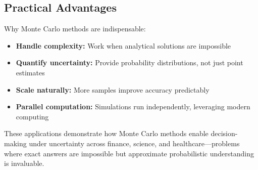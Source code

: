 \subsection{Practical Advantages}

Why Monte Carlo methods are indispensable:
\begin{itemize}
    \item \textbf{Handle complexity:} Work when analytical solutions are impossible
    \item \textbf{Quantify uncertainty:} Provide probability distributions, not just point estimates
    \item \textbf{Scale naturally:} More samples improve accuracy predictably
    \item \textbf{Parallel computation:} Simulations run independently, leveraging modern computing
\end{itemize}

These applications demonstrate how Monte Carlo methods enable decision-making under uncertainty across finance, science, and healthcare—problems where exact answers are impossible but approximate probabilistic understanding is invaluable.

